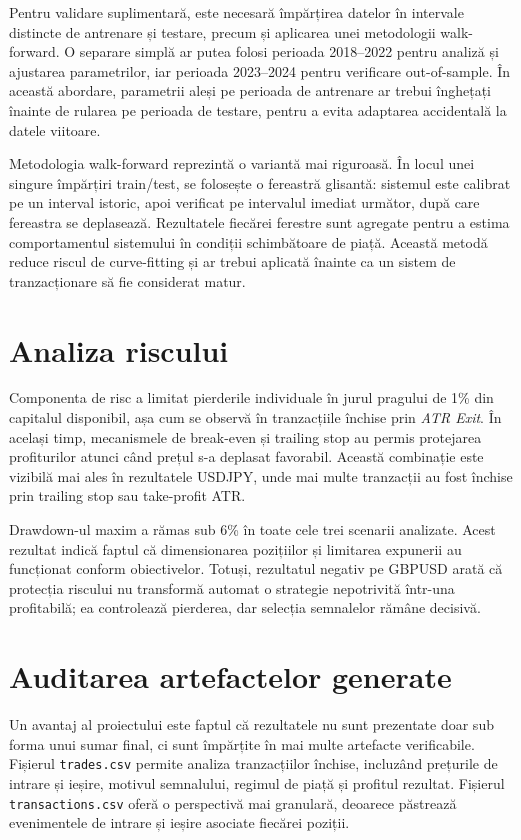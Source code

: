 Pentru validare suplimentară, este necesară împărțirea datelor în intervale distincte de antrenare și testare, precum și aplicarea unei metodologii walk-forward. O separare simplă ar putea folosi perioada 2018--2022 pentru analiză și ajustarea parametrilor, iar perioada 2023--2024 pentru verificare out-of-sample. În această abordare, parametrii aleși pe perioada de antrenare ar trebui înghețați înainte de rularea pe perioada de testare, pentru a evita adaptarea accidentală la datele viitoare.

Metodologia walk-forward reprezintă o variantă mai riguroasă. În locul unei singure împărțiri train/test, se folosește o fereastră glisantă: sistemul este calibrat pe un interval istoric, apoi verificat pe intervalul imediat următor, după care fereastra se deplasează. Rezultatele fiecărei ferestre sunt agregate pentru a estima comportamentul sistemului în condiții schimbătoare de piață. Această metodă reduce riscul de curve-fitting și ar trebui aplicată înainte ca un sistem de tranzacționare să fie considerat matur.

\section{Analiza riscului}
\label{cap:cap4:analiza_risc}

Componenta de risc a limitat pierderile individuale în jurul pragului de 1\% din capitalul disponibil, așa cum se observă în tranzacțiile închise prin \textit{ATR Exit}. În același timp, mecanismele de break-even și trailing stop au permis protejarea profiturilor atunci când prețul s-a deplasat favorabil. Această combinație este vizibilă mai ales în rezultatele USDJPY, unde mai multe tranzacții au fost închise prin trailing stop sau take-profit ATR.

Drawdown-ul maxim a rămas sub 6\% în toate cele trei scenarii analizate. Acest rezultat indică faptul că dimensionarea pozițiilor și limitarea expunerii au funcționat conform obiectivelor. Totuși, rezultatul negativ pe GBPUSD arată că protecția riscului nu transformă automat o strategie nepotrivită într-una profitabilă; ea controlează pierderea, dar selecția semnalelor rămâne decisivă.

\section{Auditarea artefactelor generate}
\label{cap:cap4:audit_artefacte}

Un avantaj al proiectului este faptul că rezultatele nu sunt prezentate doar sub forma unui sumar final, ci sunt împărțite în mai multe artefacte verificabile. Fișierul \texttt{trades.csv} permite analiza tranzacțiilor închise, incluzând prețurile de intrare și ieșire, motivul semnalului, regimul de piață și profitul rezultat. Fișierul \texttt{transactions.csv} oferă o perspectivă mai granulară, deoarece păstrează evenimentele de intrare și ieșire asociate fiecărei poziții.

